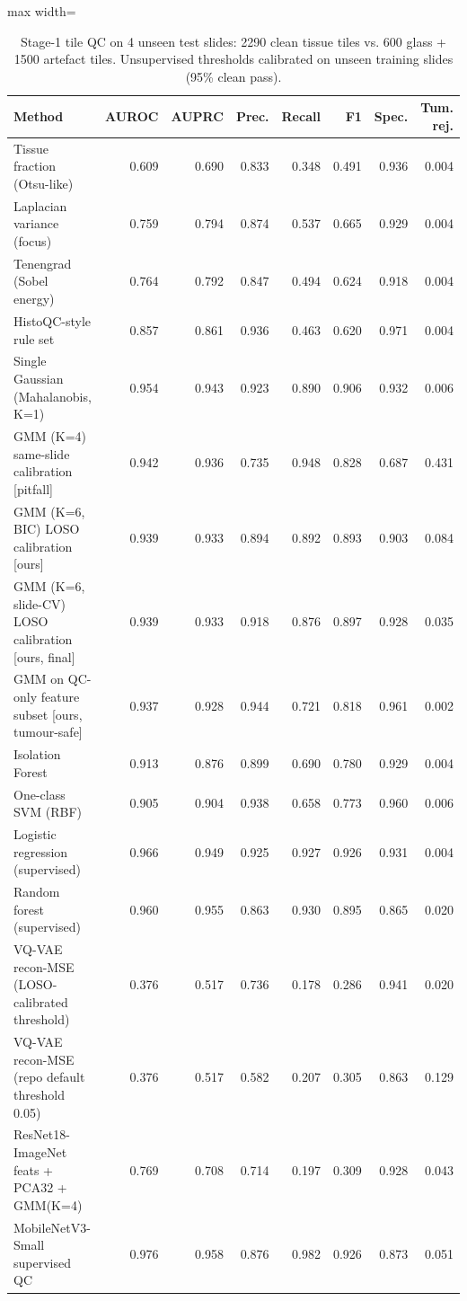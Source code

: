 \begin{table}[H]\centering\small
\caption{Stage-1 tile QC on 4 unseen test slides: 2290 clean tissue tiles vs. 600 glass + 1500 artefact tiles. Unsupervised thresholds calibrated on unseen training slides (95\% clean pass).}\label{tab:qc}
\begin{adjustbox}{max width=\linewidth}\begin{tabular}{>{\raggedright\arraybackslash}p{6.8cm}rrrrrrr}\toprule
\textbf{Method} & \textbf{AUROC} & \textbf{AUPRC} & \textbf{Prec.} & \textbf{Recall} & \textbf{F1} & \textbf{Spec.} & \textbf{Tum. rej.} \\\midrule
Tissue fraction (Otsu-like) & 0.609 & 0.690 & 0.833 & 0.348 & 0.491 & 0.936 & 0.004 \\
Laplacian variance (focus) & 0.759 & 0.794 & 0.874 & 0.537 & 0.665 & 0.929 & 0.004 \\
Tenengrad (Sobel energy) & 0.764 & 0.792 & 0.847 & 0.494 & 0.624 & 0.918 & 0.004 \\
HistoQC-style rule set & 0.857 & 0.861 & 0.936 & 0.463 & 0.620 & 0.971 & 0.004 \\
Single Gaussian (Mahalanobis, K=1) & 0.954 & 0.943 & 0.923 & 0.890 & 0.906 & 0.932 & 0.006 \\
GMM (K=4) same-slide calibration {[}pitfall{]} & 0.942 & 0.936 & 0.735 & 0.948 & 0.828 & 0.687 & 0.431 \\
GMM (K=6, BIC) LOSO calibration {[}ours{]} & 0.939 & 0.933 & 0.894 & 0.892 & 0.893 & 0.903 & 0.084 \\
GMM (K=6, slide-CV) LOSO calibration {[}ours, final{]} & 0.939 & 0.933 & 0.918 & 0.876 & 0.897 & 0.928 & 0.035 \\
GMM on QC-only feature subset {[}ours, tumour-safe{]} & 0.937 & 0.928 & 0.944 & 0.721 & 0.818 & 0.961 & 0.002 \\
Isolation Forest & 0.913 & 0.876 & 0.899 & 0.690 & 0.780 & 0.929 & 0.004 \\
One-class SVM (RBF) & 0.905 & 0.904 & 0.938 & 0.658 & 0.773 & 0.960 & 0.006 \\
Logistic regression (supervised) & 0.966 & 0.949 & 0.925 & 0.927 & 0.926 & 0.931 & 0.004 \\
Random forest (supervised) & 0.960 & 0.955 & 0.863 & 0.930 & 0.895 & 0.865 & 0.020 \\
VQ-VAE recon-MSE (LOSO-calibrated threshold) & 0.376 & 0.517 & 0.736 & 0.178 & 0.286 & 0.941 & 0.020 \\
VQ-VAE recon-MSE (repo default threshold 0.05) & 0.376 & 0.517 & 0.582 & 0.207 & 0.305 & 0.863 & 0.129 \\
ResNet18-ImageNet feats + PCA32 + GMM(K=4) & 0.769 & 0.708 & 0.714 & 0.197 & 0.309 & 0.928 & 0.043 \\
MobileNetV3-Small supervised QC & 0.976 & 0.958 & 0.876 & 0.982 & 0.926 & 0.873 & 0.051 \\
\bottomrule\end{tabular}\end{adjustbox}\end{table}